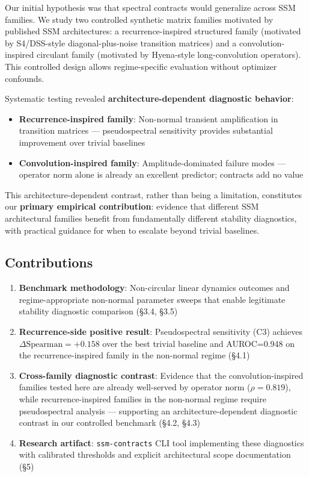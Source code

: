 \documentclass[twoside]{article}
\begin{document}
Our initial hypothesis was that spectral contracts would generalize across SSM families. We study two controlled synthetic matrix families motivated by published SSM architectures: a recurrence-inspired structured family (motivated by S4/DSS-style diagonal-plus-noise transition matrices) and a convolution-inspired circulant family (motivated by Hyena-style long-convolution operators). This controlled design allows regime-specific evaluation without optimizer confounds.

Systematic testing revealed \textbf{architecture-dependent diagnostic behavior}:

\begin{itemize}
\item \textbf{Recurrence-inspired family}: Non-normal transient amplification in transition matrices — pseudospectral sensitivity provides substantial improvement over trivial baselines
\item \textbf{Convolution-inspired family}: Amplitude-dominated failure modes — operator norm alone is already an excellent predictor; contracts add no value
\end{itemize}

This architecture-dependent contrast, rather than being a limitation, constitutes our \textbf{primary empirical contribution}: evidence that different SSM architectural families benefit from fundamentally different stability diagnostics, with practical guidance for when to escalate beyond trivial baselines.

\subsection{Contributions}

\begin{enumerate}
\item \textbf{Benchmark methodology}: Non-circular linear dynamics outcomes and regime-appropriate non-normal parameter sweeps that enable legitimate stability diagnostic comparison (§3.4, §3.5)

\item \textbf{Recurrence-side positive result}: Pseudospectral sensitivity (C3) achieves $\Delta\text{Spearman}=+0.158$ over the best trivial baseline and AUROC=0.948 on the recurrence-inspired family in the non-normal regime (§4.1)

\item \textbf{Cross-family diagnostic contrast}: Evidence that the convolution-inspired families tested here are already well-served by operator norm ($\rho=0.819$), while recurrence-inspired families in the non-normal regime require pseudospectral analysis — supporting an architecture-dependent diagnostic contrast in our controlled benchmark (§4.2, §4.3)

\item \textbf{Research artifact}: \texttt{ssm-contracts} CLI tool implementing these diagnostics with calibrated thresholds and explicit architectural scope documentation (§5)
\end{enumerate}
\end{document}
